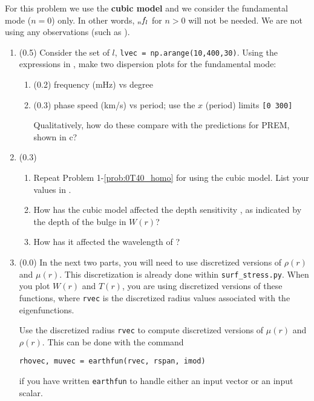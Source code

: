 \documentclass[11pt,titlepage,fleqn]{article}
\newcommand{\tfileB}{{\tt surf\_stress.py}}
\begin{document}
For this problem we use the {\bf cubic model} and we consider the fundamental mode ($n=0$) only. In other words, $\mbox{${}_{n\hspace{-0.2 mm}}f_l$}$ for $n > 0$ will not be needed. We are not using any observations (such as ).

\begin{enumerate}
\item (0.5) Consider the set of $l$, \verb+lvec = np.arange(10,400,30)+. Using the expressions in , make two dispersion plots for the fundamental mode:
%
\begin{enumerate}
\item (0.2) frequency (mHz) vs degree

\item (0.3) phase speed (km/s) vs period; use the $x$ (period) limits \verb+[0 300]+

Qualitatively, how do these compare with the predictions for PREM, shown in c?
\end{enumerate}

\item (0.3)
%
\begin{enumerate}
\item Repeat Problem 1-\ref{prob:0T40_homo} for  using the cubic model. List your values in .
\item How has the cubic model affected the depth sensitivity , as indicated by the depth of the bulge in $W(r)$?
\item How has it affected the wavelength of ?
\end{enumerate}

\label{prob:0T40_cubic}


\item (0.0) In the next two parts, you will need to use discretized versions of $\rho(r)$ and $\mu(r)$. This discretization is already done within \tfileB. When you plot $W(r)$ and $T(r)$, you are using discretized versions of these functions, where \verb+rvec+ is the discretized radius values associated with the eigenfunctions.

Use the discretized radius \verb+rvec+ to compute discretized versions of $\mu(r)$ and $\rho(r)$. This can be done with the command
%
\begin{verbatim}
rhovec, muvec = earthfun(rvec, rspan, imod)
\end{verbatim}
%
if you have written \verb+earthfun+ to handle either an input vector or an input scalar.


\end{enumerate}
\end{document}
